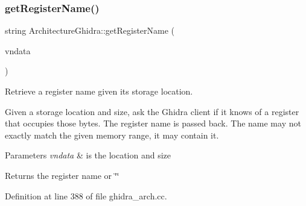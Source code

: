 \subsubsection{\texorpdfstring{getRegisterName()}{getRegisterName()}}
{\footnotesize\ttfamily string Architecture\+Ghidra\+::get\+Register\+Name (\begin{DoxyParamCaption}\item[{const \mbox{\hyperlink{struct_varnode_data}{Varnode\+Data}} \&}]{vndata }\end{DoxyParamCaption})}



Retrieve a register name given its storage location. 

Given a storage location and size, ask the Ghidra client if it knows of a register that occupies those bytes. The register name is passed back. The name may not exactly match the given memory range, it may contain it. 
\begin{DoxyParams}{Parameters}
{\em vndata} & is the location and size \\
\hline
\end{DoxyParams}
\begin{DoxyReturn}{Returns}
the register name or \char`\"{}\char`\"{} 
\end{DoxyReturn}


Definition at line 388 of file ghidra\+\_\+arch.\+cc.

